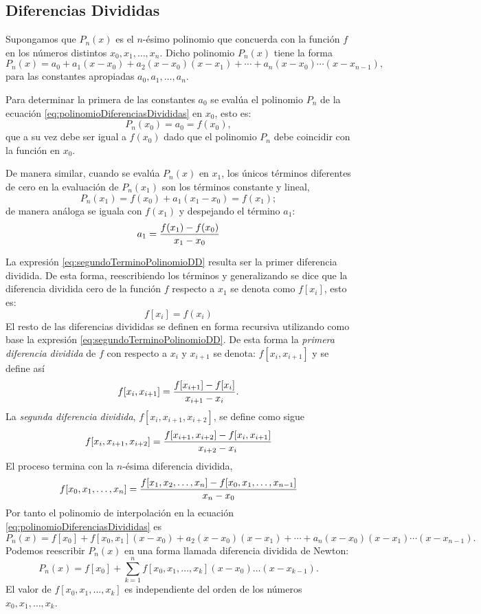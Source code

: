 \subsection{Diferencias Divididas}

Supongamos que $P_n(x)$ es el $n$-ésimo polinomio que concuerda con la función $f$ en los números distintos $x_0, x_1, \dots , x_n$. Dicho
polinomio $P_n(x)$ tiene la forma 
\begin{equation}
	P_n(x) = a_0 + a_1(x-x_0) + a_2(x-x_0)(x-x_1) + \cdots + a_n(x-x_0)\cdots (x-x_{n-1}),
	\label{eq:polinomioDiferenciasDivididas}
\end{equation}
para las constantes apropiadas $a_0, a_1, \dots ,a_n$. 

Para determinar la primera de las constantes $a_0$ se evalúa el polinomio $P_n$ de la ecuación \ref{eq:polinomioDiferenciasDivididas} en $x_0$, esto es:
$$P_n(x_0) = a_0 = f(x_0),$$
que a su vez debe ser igual a $f(x_0)$ dado que el polinomio $P_n$ debe coincidir con la función en $x_0$.

De manera similar, cuando se evalúa $P_n(x)$ en $x_1$, los únicos términos diferentes de cero en la evaluación de $P_n(x_1)$ son los términos 
constante y lineal,
$$P_n(x_1) = f(x_0) + a_1(x_1-x_0) = f(x_1);$$ 
de manera análoga se iguala con $f(x_1)$ y despejando el término $a_1$:
\begin{equation}
	a_1 = {f(x_1) - f(x_0)\over x_1 - x_0}
	\label{eq:segundoTerminoPolinomioDD}
\end{equation}

La expresión \ref{eq:segundoTerminoPolinomioDD} resulta ser la primer diferencia dividida.
De esta forma, reescribiendo los términos y generalizando se dice que la diferencia dividida cero de la función $f$ respecto a $x_1$  se denota como $f[x_i]$, 
esto es:
$$f[x_i] = f(x_i)$$
El resto de las diferencias divididas se definen en forma recursiva utilizando como base la expresión \ref{eq:segundoTerminoPolinomioDD}. De esta forma 
la \textit{primera diferencia dividida} de $f$ con respecto a $x_i$ y $x_{i+1}$ se denota:
$f[x_i, x_{i+1}]$ y se define así
\begin{equation}
	f[x_i, x_{i+1}] = {f[x_{i+1}] - f[x_i]\over x_{i+1} - x_i}.
	\label{eq:primeraDiferenciaDividida}
\end{equation}
La \textit{segunda diferencia dividida}, $f[x_i, x_{i+1}, x_{i+2}]$, se define como sigue
$$f[x_i, x_{i+1}, x_{i+2}] = {f[x_{i+1}, x_{i+2}] - f[x_i, x_{i+1}]\over x_{i+2} - x_i}$$
El proceso termina con la $n$-ésima diferencia dividida,
$$f[x_0, x_1, \dots, x_n] = {f[x_1, x_2, \dots , x_n] - f[x_0, x_1, \dots, x_{n-1}] \over x_n - x_0}$$
Por tanto el polinomio de interpolación en la ecuación \ref{eq:polinomioDiferenciasDivididas} es
$$P_n(x) = f[x_0] + f[x_0, x_1](x-x_0) + a_2(x-x_0)(x-x_1) + \cdots + a_n(x-x_0)(x-x_1)\cdots (x-x_{n-1}).$$
Podemos reescribir $P_n(x)$ en una forma llamada diferencia dividida de Newton:
\begin{equation}
	P_n(x) = f[x_0] + \sum_{k=1}^n f[x_0, x_1, \dots , x_k](x-x_0)\dots (x-x_{k-1}).
	\label{eq:diferenciaDivididaNewton}
\end{equation}
El valor de $f[x_0, x_1, \dots, x_k]$ es independiente del orden de los números $x_0, x_1, \dots, x_k$.


